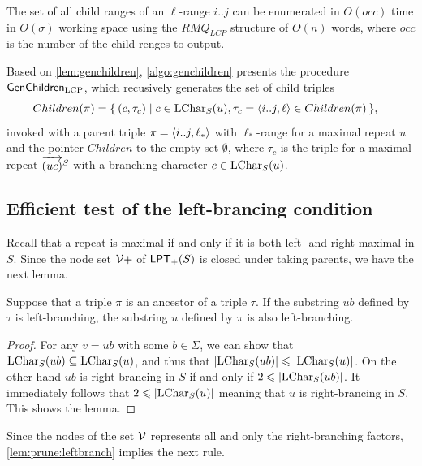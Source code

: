 \documentclass{article}
\begin{document}
\begin{lemma}\label{lem:genchildren}
  The set of all child ranges of an $\ell$-range $i..j$ can be enumerated in $O(occ)$ time in $O(\sigma)$ working space
  using the $RMQ_{LCP}$ structure of $O(n)$ words, 
where $occ$ is the number of the child renges to output.  
\end{lemma}

Based on \cref{lem:genchildren}, \cref{algo:genchildren} presents the procedure $\textsf{GenChildren}_{{\mathrm{LCP}}}$, which recusively generates the set of child triples
\begin{align}
  Children(\pi)
  &= \{\kern0.2em (c, \tau_c) \mid c \in \mathrm{LChar}_{S}(u), \tau_c = \langle i..j, \ell\rangle \in Children(\pi)\kern0.2em\}, 
\end{align}
invoked with a parent triple $\pi = \langle i..j, \ell_*\rangle$ with $\ell_*$-range for a maximal repeat $u$ and the pointer $Children$ to the empty set $\emptyset$,
where $\tau_c$ is the triple for a maximal repeat $\overrightarrow{(uc)}^{S}$ with a branching character $c \in \mathrm{LChar}_{S}(u)$.

\subsection{Efficient test of the left-brancing condition}

Recall that a repeat is maximal if and only if it is both left- and right-maximal in $S$. Since the node set $\mathcal{V}+$ of $\mathsf{LPT}_{+}(S)$ is closed under taking parents, we have the next lemma.

\begin{lemma}\label{lem:prune:leftbranch}
Suppose that a triple $\pi$ is an ancestor of a triple $\tau$. If the substring $ub$ defined by $\tau$ is left-branching, the substring $u$ defined by $\pi$ is also left-branching. 
\end{lemma}

\begin{proof}
  For any $v = ub$ with some $b \in \Sigma$, we can show that
  $\mathrm{LChar}_{S}(ub) \subseteq \mathrm{LChar}_{S}(u)$, and thus that $|\mathrm{LChar}_{S}(ub)| \leqslant |\mathrm{LChar}_{S}(u)|$. On the other hand $ub$ is right-brancing in $S$ if and only if $2\leqslant |\mathrm{LChar}_{S}(ub)|$. It immediately follows that $2 \leqslant |\mathrm{LChar}_{S}(u)|$ meaning that $u$ is right-brancing in $S$. This shows the lemma. 
\end{proof}


Since the nodes of the set $\mathcal{V}$ represents all and only the right-branching factors, \cref{lem:prune:leftbranch} implies the next rule.
\end{document}
